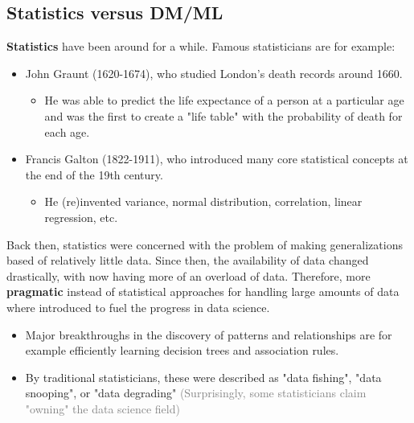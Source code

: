 \subsection{Statistics versus DM/ML}

\textbf{Statistics} have been around for a while. Famous statisticians are for example:
\begin{itemize}
  \item John Graunt (1620-1674), who studied London's death records around 1660.
  \begin{itemize}
    \item He was able to predict the life expectance of a person at a particular age and was the first to create a "life table" with the probability of death for each age.
  \end{itemize}
  \item Francis Galton (1822-1911), who introduced many core statistical concepts at the end of the 19th century.
  \begin{itemize}
    \item He (re)invented variance, normal distribution, correlation, linear regression, etc.
  \end{itemize}
\end{itemize}

Back then, statistics were concerned with the problem of making generalizations based of relatively little data. Since then, the availability of data changed drastically, with now having more of an overload of data. Therefore, more \textbf{pragmatic} instead of statistical approaches for handling large amounts of data where introduced to fuel the progress in data science.
\begin{itemize}
  \item Major breakthroughs in the discovery of patterns and relationships are for example efficiently learning decision trees and association rules.
  \item By traditional statisticians, these were described as "data fishing", "data snooping", or "data degrading" \textcolor{gray}{\footnotesize(Surprisingly, some statisticians claim "owning" the data science field)}
\end{itemize}

